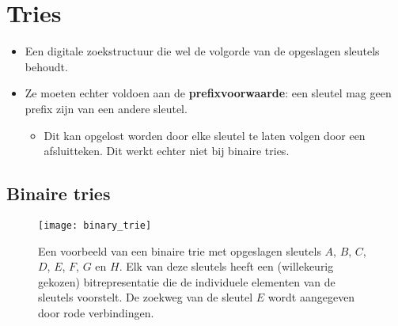 \section{Tries}
\begin{itemize}
    \item Een digitale zoekstructuur die wel de volgorde van de opgeslagen sleutels behoudt.
    \item Ze moeten echter voldoen aan de \textbf{prefixvoorwaarde}: een sleutel mag geen prefix zijn van een andere sleutel. 
    \begin{itemize}
        \item Dit kan opgelost worden door elke sleutel te laten volgen door een afsluitteken. Dit werkt echter niet bij binaire tries.
    \end{itemize}
\end{itemize}

\subsection{Binaire tries}

\begin{figure}[ht]
    \centering
    \texttt{[image: binary\_trie]}
    \caption{Een voorbeeld van een binaire trie met opgeslagen sleutels $A$, $B$, $C$, $D$, $E$, $F$, $G$ en $H$. Elk van deze sleutels heeft een (willekeurig gekozen) bitrepresentatie die de individuele elementen van de sleutels voorstelt. De zoekweg van de sleutel $E$ wordt aangegeven door rode verbindingen.}
    \label{fig:binary_trie}
\end{figure}

